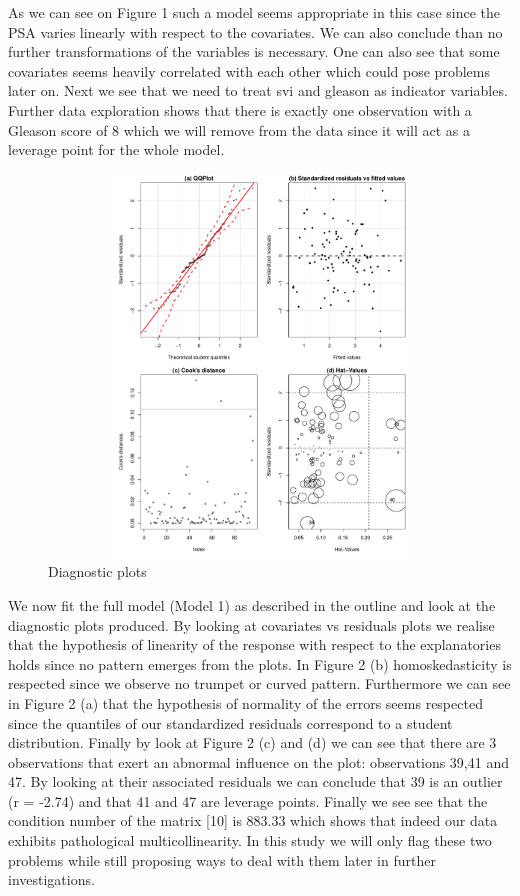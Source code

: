 \documentclass[10pt]{article}
\begin{document}
As we can see on Figure 1 such a model seems appropriate in this case since the PSA varies linearly with respect to the covariates. We can also conclude than no further transformations of the variables is necessary. One can also see that some covariates seems heavily correlated with each other which could pose problems later on. Next we see that we need to treat svi and gleason as indicator variables. Further data exploration shows that there is exactly one observation with a Gleason score of 8 which we will remove from the data since it will act as a leverage point for the whole model.

\begin{figure}[htb]
\begin{center}
\includegraphics[height=4in,width=5in]{diagnostics_full_model.pdf}
\caption{Diagnostic plots}
\end{center}
\end{figure}

We now fit the full model (Model 1) as described in the outline and look at the diagnostic plots produced. By looking at covariates vs residuals plots we realise that the hypothesis of linearity of the response with respect to the explanatories holds since no pattern emerges from the plots. In Figure 2 (b) homoskedasticity  is respected since we observe no trumpet or curved pattern. Furthermore we can see in Figure 2 (a) that the hypothesis of normality of the errors seems respected since the quantiles of our standardized residuals correspond to a student distribution. Finally by look at Figure 2 (c) and (d) we can see that there are 3 observations that exert an abnormal influence on the plot: observations 39,41 and 47. By looking at their associated residuals we can conclude that 39 is an outlier (r = -2.74) and that 41 and 47 are leverage points. Finally we see see that the condition number of the matrix [10] is 883.33 which shows that indeed our data exhibits pathological multicollinearity. In this study we will only flag these two problems while still proposing ways to deal with them later in further investigations.
\end{document}
